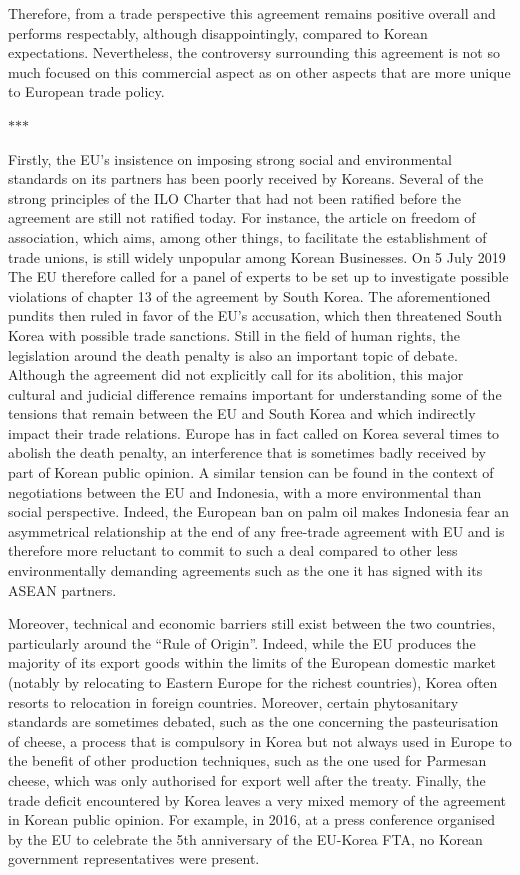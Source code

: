 \documentclass[11pt,a4paper]{article}
\newcommand{\partbreak}{\par\begin{center}\color{muted}$\ast$\quad$\ast$\quad$\ast$\end{center}\par}
\begin{document}
Therefore, from a trade perspective this agreement remains positive overall and performs respectably, although disappointingly, compared to Korean expectations. Nevertheless, the controversy surrounding this agreement is not so much focused on this commercial aspect as on other aspects that are more unique to European trade policy.

\partbreak

Firstly, the EU’s insistence on imposing strong social and environmental standards on its partners has been poorly received by Koreans. Several of the strong principles of the ILO Charter that had not been ratified before the agreement are still not ratified today. For instance, the article on freedom of association, which aims, among other things, to facilitate the establishment of trade unions, is still widely unpopular among Korean Businesses. On 5 July 2019 The EU therefore called for a panel of experts to be set up to investigate possible violations of chapter 13 of the agreement by South Korea. The aforementioned pundits then ruled in favor of the EU’s accusation, which then threatened South Korea with possible trade sanctions. Still in the field of human rights, the legislation around the death penalty is also an important topic of debate. Although the agreement did not explicitly call for its abolition, this major cultural and judicial difference remains important for understanding some of the tensions that remain between the EU and South Korea and which indirectly impact their trade relations. Europe has in fact called on Korea several times to abolish the death penalty, an interference that is sometimes badly received by part of Korean public opinion. A similar tension can be found in the context of negotiations between the EU and Indonesia, with a more environmental than social perspective. Indeed, the European ban on palm oil makes Indonesia fear an asymmetrical relationship at the end of any free-trade agreement with EU and is therefore more reluctant to commit to such a deal compared to other less environmentally demanding agreements such as the one it has signed with its ASEAN partners.

Moreover, technical and economic barriers still exist between the two countries, particularly around the “Rule of Origin”. Indeed, while the EU produces the majority of its export goods within the limits of the European domestic market (notably by relocating to Eastern Europe for the richest countries), Korea often resorts to relocation in foreign countries. Moreover, certain phytosanitary standards are sometimes debated, such as the one concerning the pasteurisation of cheese, a process that is compulsory in Korea but not always used in Europe to the benefit of other production techniques, such as the one used for Parmesan cheese, which was only authorised for export well after the treaty. Finally, the trade deficit encountered by Korea leaves a very mixed memory of the agreement in Korean public opinion. For example, in 2016, at a press conference organised by the EU to celebrate the 5th anniversary of the EU-Korea FTA, no Korean government representatives were present.
\end{document}
